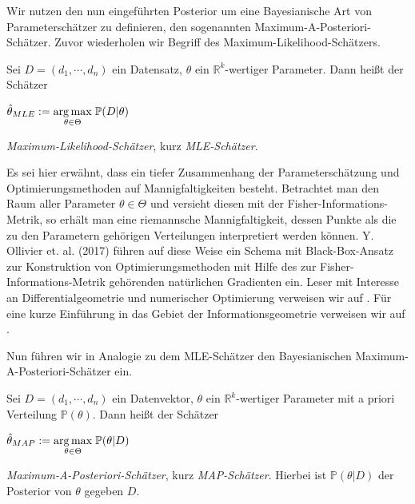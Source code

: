 

Wir nutzen den nun eingeführten Posterior um eine Bayesianische Art von Parameterschätzer zu definieren, den sogenannten Maximum-A-Posteriori-Schätzer. Zuvor wiederholen wir Begriff des Maximum-Likelihood-Schätzers.

\begin{defi}
	Sei $D = (d_1, \cdots, d_n)$ ein Datensatz, $\theta$ ein $\mathbb{R}^k$-wertiger 
	Parameter. Dann heißt der Schätzer
	\begin{center}
		$\hat{\theta}_{MLE} := \underset{\theta \in \Theta}{\arg \max}\hspace{0.1cm} \mathbb{P}(D \vert \theta)$
	\end{center}
	\textit{Maximum-Likelihood-Schätzer}, kurz \textit{MLE-Schätzer}.
\end{defi}

Es sei hier erwähnt, dass ein tiefer Zusammenhang der Parameterschätzung und Optimierungsmethoden auf Mannigfaltigkeiten besteht. Betrachtet man den Raum aller Parameter $\theta \in \Theta$ und versieht diesen mit der Fisher-Informations-Metrik, so erhält man eine riemannsche Mannigfaltigkeit, dessen Punkte als die zu den Parametern gehörigen Verteilungen interpretiert werden können. Y. Ollivier et. al. (2017) führen auf diese Weise ein Schema mit Black-Box-Ansatz zur Konstruktion von Optimierungsmethoden mit Hilfe des zur Fisher-Informations-Metrik gehörenden natürlichen Gradienten ein. Leser mit Interesse an Differentialgeometrie und numerischer Optimierung verweisen wir auf \cite{Info_Geom}. Für eine kurze Einführung in das Gebiet der Informationsgeometrie verweisen wir auf \cite{Info_Geom_intro}.

Nun führen wir in Analogie zu dem MLE-Schätzer den Bayesianischen Maximum-A-Posteriori-Schätzer ein.

\begin{defi}
	Sei $D = (d_1, \cdots, d_n)$ ein Datenvektor, $\theta$ ein $\mathbb{R}^k$-wertiger
	Parameter mit a priori Verteilung $\mathbb{P}(\theta)$. Dann heißt der Schätzer
	\begin{center}
		$\hat{\theta}_{MAP} := \underset{\theta \in \Theta}{\arg \max} \hspace{0.1cm} \mathbb{P}(\theta \vert 					D)$
	\end{center}
	\textit{Maximum-A-Posteriori-Schätzer}, kurz \textit{MAP-Schätzer}. Hierbei ist 
	$\mathbb{P}(\theta \vert D)$ der Posterior von $\theta$ gegeben $D$.
\end{defi}

